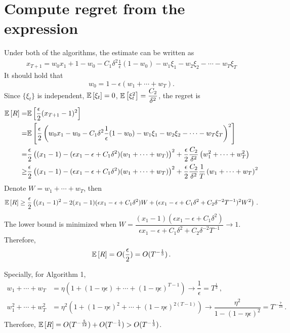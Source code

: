 \documentclass[11pt,letterpaper,english]{article}
\begin{document}
\section{Compute regret from the expression}
Under both of the algorithms, the estimate can be written as
\begin{align*}
x_{T+1} = w_0 x_1 + 1-w_0 -C_1 \delta^2 \frac{1}{\epsilon}(1-w_0) -w_1 \xi_1 - w_2 \xi_2 - \cdots - w_T \xi_T
\end{align*}
It should hold that 
\[w_0 = 1-\epsilon (w_1+\cdots+w_T).\]
Since $\{\xi_t\}$ is independent, $\mathbb{E}\left[\xi_t\right]=0$, $\mathbb{E}\left[\xi_t^2\right]=\dfrac{C_2}{\delta^2}$, 
the regret is
\begin{align*}
\mathbb{E}\left[R\right] =&\mathbb{E}\left[ \frac{\epsilon}{2} (x_{T+1}-1)^2\right]\\
=& \mathbb{E}\left[\frac{\epsilon}{2} \left(w_0 x_1 -w_0 -C_1 \delta^2 \frac{1}{\epsilon}(1-w_0) -w_1 \xi_1 - w_2 \xi_2 - \cdots - w_T \xi_T  \right)^2\right] \\
=& \dfrac{\epsilon}{2} \left( (x_1-1)-(\epsilon x_1 -\epsilon +C_1\delta^2)(w_1+\cdots+w_T) \right)^2 + \dfrac{\epsilon}{2} \dfrac{C_2}{\delta^2} \left(w_1^2+\cdots+w_T^2  \right) \\
\geq& \dfrac{\epsilon}{2} \left( (x_1-1)-(\epsilon x_1 -\epsilon +C_1\delta^2)(w_1+\cdots+w_T) \right)^2 + \dfrac{\epsilon}{2} \dfrac{C_2}{\delta^2}\dfrac{1}{T} \left(w_1+\cdots+w_T  \right)^2
\end{align*}
Denote $W = w_1+\cdots+w_T$, then 
\begin{align*}
\mathbb{E}\left[R\right] \geq  \dfrac{\epsilon}{2} \left( (x_1-1)^2-2(x_1-1)(\epsilon x_1-\epsilon +C_1 \delta^2)W + (\epsilon x_1-\epsilon +C_1 \delta^2+C_2 \delta^{-2}T^{-1})^2W^2  \right) \,.
\end{align*}
The lower bound is minimized when $W=\dfrac{(x_1-1)(\epsilon x_1-\epsilon +C_1 \delta^2)}{\epsilon x_1-\epsilon +C_1 \delta^2+C_2 \delta^{-2}T^{-1}} \to 1$. Therefore, 
\begin{align*}
\mathbb{E}\left[R\right] = O(\dfrac{\epsilon}{2}) = O(T^{-\frac{1}{3}})\,.
\end{align*}

Specially, for Algorithm 1, 
\begin{align*}
w_1+\cdots+w_T&= \eta \left( 1+(1-\eta \epsilon)+\cdots+(1-\eta \epsilon)^{T-1} \right)\to \dfrac{1}{\epsilon} =T^{\frac{1}{3}}\,,\\
w_1^2+\cdots+w_T^2&=\eta^2 \left( 1+(1-\eta \epsilon)^2+\cdots+(1-\eta \epsilon)^{2(T-1)} \right) \to \dfrac{\eta^2}{1-(1-\eta \epsilon)^2}= T^{-\frac{7}{24}}\,.
\end{align*}
Therefore, $\mathbb{E}\left[R\right] = O(T^{-\frac{5}{12}})+O(T^{-\frac{1}{4}})>O(T^{-\frac{1}{3}})$.
\end{document}

